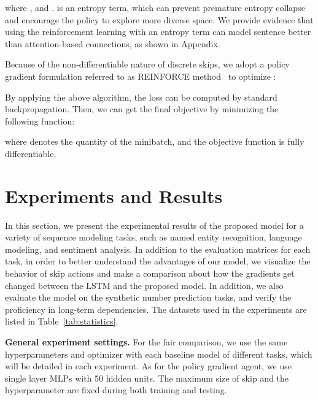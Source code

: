 \documentclass[letterpaper]{article} \usepackage{aaai19}  \usepackage{times}  \usepackage{helvet}  \usepackage{courier}  \usepackage{url}  \usepackage{graphicx}  \usepackage{amsmath}
\begin{document}
where , and .  is an entropy term, which can prevent premature entropy collapse and encourage the policy to explore more diverse space. We provide evidence that using the reinforcement learning with an entropy term can model sentence better than attention-based connections, as shown in Appendix.

Because of the non-differentiable nature of discrete skips, we adopt a policy gradient formulation referred to as REINFORCE method~\cite{williams1992simple} to optimize :

By applying the above algorithm, the loss  can be computed by standard backpropagation. Then, we can get the final objective by minimizing the following function:

where  denotes the quantity of the minibatch, and the objective function is fully differentiable.



\section{Experiments and Results}
In this section, we present the experimental results of the proposed model for a variety of sequence modeling tasks, such as named entity recognition, language modeling, and sentiment analysis. In addition to the evaluation matrices for each task, in order to better understand the advantages of our model, we visualize the behavior of skip actions and make a comparison about how the gradients get changed between the LSTM and the proposed model. In addition, we also evaluate the model on the synthetic number prediction tasks, and verify the proficiency in long-term dependencies. The datasets used in the experiments are listed in Table~\ref{tab:statistics}.

\noindent \textbf{General experiment settings.} For the fair comparison, we use the same hyperparameters and optimizer with each baseline model of different tasks, which will be detailed in each experiment. As for the policy gradient agent, we use single layer MLPs with 50 hidden units. The maximum size of skip  and the hyperparameter  are fixed during both training and testing. 
\end{document}
